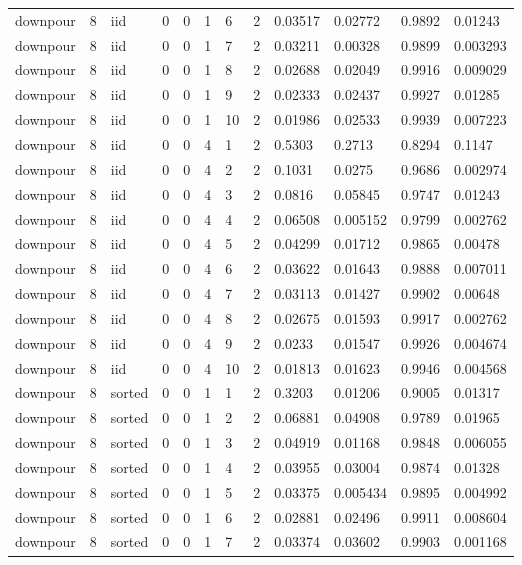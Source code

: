 \begin{tabular}{llllllllllll}
downpour & 8 & iid & 0 & 0 & 1 & 6 & 2 & 0.03517 & 0.02772 & 0.9892 & 0.01243 \\
downpour & 8 & iid & 0 & 0 & 1 & 7 & 2 & 0.03211 & 0.00328 & 0.9899 & 0.003293 \\
downpour & 8 & iid & 0 & 0 & 1 & 8 & 2 & 0.02688 & 0.02049 & 0.9916 & 0.009029 \\
downpour & 8 & iid & 0 & 0 & 1 & 9 & 2 & 0.02333 & 0.02437 & 0.9927 & 0.01285 \\
downpour & 8 & iid & 0 & 0 & 1 & 10 & 2 & 0.01986 & 0.02533 & 0.9939 & 0.007223 \\
downpour & 8 & iid & 0 & 0 & 4 & 1 & 2 & 0.5303 & 0.2713 & 0.8294 & 0.1147 \\
downpour & 8 & iid & 0 & 0 & 4 & 2 & 2 & 0.1031 & 0.0275 & 0.9686 & 0.002974 \\
downpour & 8 & iid & 0 & 0 & 4 & 3 & 2 & 0.0816 & 0.05845 & 0.9747 & 0.01243 \\
downpour & 8 & iid & 0 & 0 & 4 & 4 & 2 & 0.06508 & 0.005152 & 0.9799 & 0.002762 \\
downpour & 8 & iid & 0 & 0 & 4 & 5 & 2 & 0.04299 & 0.01712 & 0.9865 & 0.00478 \\
downpour & 8 & iid & 0 & 0 & 4 & 6 & 2 & 0.03622 & 0.01643 & 0.9888 & 0.007011 \\
downpour & 8 & iid & 0 & 0 & 4 & 7 & 2 & 0.03113 & 0.01427 & 0.9902 & 0.00648 \\
downpour & 8 & iid & 0 & 0 & 4 & 8 & 2 & 0.02675 & 0.01593 & 0.9917 & 0.002762 \\
downpour & 8 & iid & 0 & 0 & 4 & 9 & 2 & 0.0233 & 0.01547 & 0.9926 & 0.004674 \\
downpour & 8 & iid & 0 & 0 & 4 & 10 & 2 & 0.01813 & 0.01623 & 0.9946 & 0.004568 \\
downpour & 8 & sorted & 0 & 0 & 1 & 1 & 2 & 0.3203 & 0.01206 & 0.9005 & 0.01317 \\
downpour & 8 & sorted & 0 & 0 & 1 & 2 & 2 & 0.06881 & 0.04908 & 0.9789 & 0.01965 \\
downpour & 8 & sorted & 0 & 0 & 1 & 3 & 2 & 0.04919 & 0.01168 & 0.9848 & 0.006055 \\
downpour & 8 & sorted & 0 & 0 & 1 & 4 & 2 & 0.03955 & 0.03004 & 0.9874 & 0.01328 \\
downpour & 8 & sorted & 0 & 0 & 1 & 5 & 2 & 0.03375 & 0.005434 & 0.9895 & 0.004992 \\
downpour & 8 & sorted & 0 & 0 & 1 & 6 & 2 & 0.02881 & 0.02496 & 0.9911 & 0.008604 \\
downpour & 8 & sorted & 0 & 0 & 1 & 7 & 2 & 0.03374 & 0.03602 & 0.9903 & 0.001168 \\

\end{tabular}
